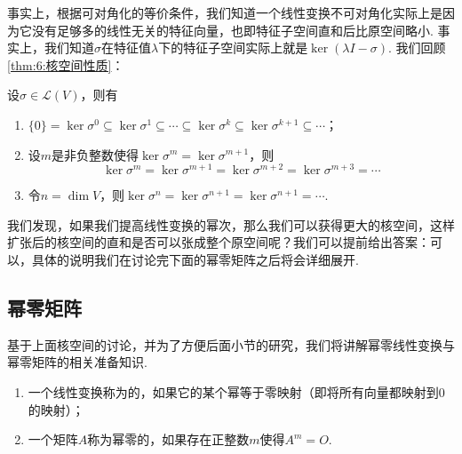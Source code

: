 事实上，根据可对角化的等价条件，我们知道一个线性变换不可对角化实际上是因为它没有足够多的线性无关的特征向量，也即特征子空间直和后比原空间略小. 事实上，我们知道$\sigma$在特征值$\lambda$下的特征子空间实际上就是$\ker(\lambda I-\sigma)$. 我们回顾\autoref{thm:6:核空间性质}：
\begin{theorem}\label{thm:17:核空间性质}
    设$\sigma\in \mathcal{L}(V)$，则有
    \begin{enumerate}
        \item $\{0\}=\ker \sigma^0\subseteq\ker \sigma^1\subseteq\cdots\subseteq\ker \sigma^k\subseteq\ker \sigma^{k+1}\subseteq\cdots$；

        \item 设$m$是非负整数使得$\ker \sigma^m=\ker \sigma^{m+1}$，则
              \[\ker \sigma^m=\ker \sigma^{m+1}=\ker \sigma^{m+2}=\ker \sigma^{m+3}=\cdots\]

        \item 令$n=\dim V$，则$\ker \sigma^n=\ker \sigma^{n+1}=\ker \sigma^{n+1}=\cdots$.
    \end{enumerate}
\end{theorem}

我们发现，如果我们提高线性变换的幂次，那么我们可以获得更大的核空间，这样扩张后的核空间的直和是否可以张成整个原空间呢？我们可以提前给出答案：可以，具体的说明我们在讨论完下面的幂零矩阵之后将会详细展开.

\subsection{幂零矩阵}

基于上面核空间的讨论，并为了方便后面小节的研究，我们将讲解幂零线性变换与幂零矩阵的相关准备知识.
\begin{definition}[幂零] 
    \begin{enumerate}
        \item 一个线性变换称为的，如果它的某个幂等于零映射（即将所有向量都映射到0的映射）；

        \item 一个矩阵$A$称为幂零的，如果存在正整数$m$使得$A^m=O$.
    \end{enumerate}
\end{definition}

